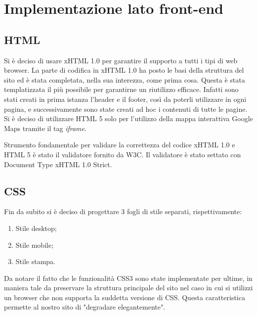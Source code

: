 \section{Implementazione lato front-end}
\label{frontend}

\subsection{HTML}
Si è deciso di usare xHTML 1.0 per garantire il supporto a tutti i tipi di web browser.
La parte di codifica in xHTML 1.0 ha posto le basi della struttura del sito ed è stata completata, nella sua interezza, come prima cosa.
Questa è stata templatizzata il più possibile per garantirne un riutilizzo efficace. Infatti sono stati creati in prima istanza l’header e il footer, così da poterli utilizzare in ogni pagina, e successivamente sono state creati ad hoc i contenuti di tutte le pagine.
Si è deciso di utilizzare HTML 5 solo per l'utilizzo della mappa interattiva Google Maps tramite il tag \textit{iframe}.


Strumento fondamentale per validare la correttezza del codice xHTML 1.0 e HTML 5 è stato il validatore fornito da W3C. Il validatore è stato settato con Document Type xHTML 1.0 Strict.

\subsection{CSS}
Fin da subito si è deciso di progettare 3 fogli di stile separati, rispettivamente: 
\begin{enumerate}
\item Stile desktop;
\item Stile mobile;
\item Stile stampa.
\end{enumerate}

Da notare il fatto che le funzionalità CSS3 sono state implementate per ultime, in maniera tale da preservare la struttura principale del sito nel caso in cui si utilizzi un browser che non supporta la suddetta versione di CSS. Questa caratteristica permette al nostro sito di "degradare elegantemente".

